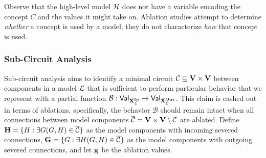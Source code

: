 \documentclass[twoside,11pt]{article}
\begin{document}
{
  }

Observe that the high-level model $\mathcal{H}$ does not have a variable encoding the concept $C$ and the values it might take on. Ablation studies attempt to determine \textit{whether} a concept is used by a model; they do not characterize \textit{how} that concept is used. 


\subsubsection{Sub-Circuit Analysis}\label{sec:subcircuit}
Sub-circuit analysis \citep{sixteen_heads_better_than_one,lowcomplexity_probing, Csordas2021, cammarata2020thread,olsson2022context,chan2022causal,Lepori2023a,Lepori2023b,wang2023interpretability, automated_discovery} aims to identify a minimal circuit $\mathcal{C} \subseteq \mathbf{V} \times \mathbf{V}$ between components in a model $\mathcal{L}$ that is sufficient to perform particular behavior that we represent with a partial function $\mathcal{B}:\mathsf{Val}_{\mathbf{X}^{\mathbf{In}}_{\mathcal{L}}} \to \mathsf{Val}_{\mathbf{X}^{\mathbf{Out}}_{\mathcal{L}}}$. This claim is cashed out in terms of ablations, specifically, the behavior $\mathcal{B}$ should remain intact when all connections between model components $\overline{\mathcal{C}} = \mathbf{V} \times \mathbf{V} \setminus \mathcal{C}$ are ablated. Define $\mathbf{H} = \{H: \exists G(G, H) \in \overline{\mathcal{C}}\}$ as the model components with incoming severed connections, $\mathbf{G} = \{G: \exists H (G, H) \in \overline{\mathcal{C}}\}$ as the model components with outgoing severed connections, and let $\mathbf{g}$ be the ablation values.
\end{document}
